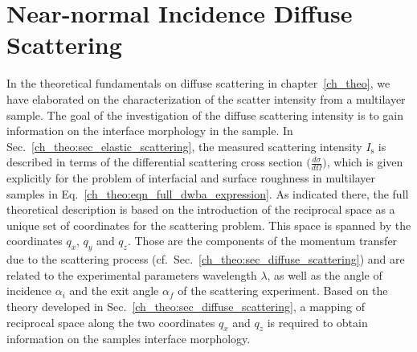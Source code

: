 \section{Near-normal Incidence Diffuse Scattering} \label{ch_diff:sec_PTB17}
In the theoretical fundamentals on diffuse scattering in chapter~\ref{ch_theo}, we have elaborated on the characterization of the scatter intensity from a multilayer sample. The goal of the investigation of the diffuse scattering intensity is to gain information on the interface morphology in the sample. In Sec.~\ref{ch_theo:sec_elastic_scattering}, the measured scattering intensity $I_\text{s}$ is described in terms of the differential scattering cross section $\big(\frac{d \sigma}{d \Omega}\big)$, which is given explicitly for the problem of interfacial and surface roughness in multilayer samples in Eq.~\eqref{ch_theo:eqn_full_dwba_expression}. As indicated there, the full theoretical description is based on the introduction of the reciprocal space as a unique set of coordinates for the scattering problem. This space is spanned by the coordinates $q_x$, $q_y$ and $q_z$. Those are the components of the momentum transfer due to the scattering process (cf.~Sec.~\ref{ch_theo:sec_diffuse_scattering}) and are related to the experimental parameters wavelength $\lambda$, as well as the angle of incidence $\alpha_i$ and the exit angle $\alpha_f$ of the scattering experiment. Based on the theory developed in Sec.~\ref{ch_theo:sec_diffuse_scattering}, a mapping of reciprocal space along the two coordinates $q_x$ and $q_z$ is required to obtain information on the samples interface morphology.

